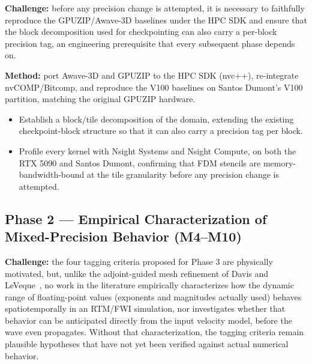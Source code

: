 \documentclass[12pt,a4paper]{article}
\begin{document}
\textbf{Challenge:} before any precision change is attempted, it is
necessary to faithfully reproduce the GPUZIP/Awave-3D baselines under the
HPC SDK and ensure that the block decomposition used for checkpointing can
also carry a per-block precision tag, an engineering prerequisite that
every subsequent phase depends on.

\textbf{Method:} port Awave-3D and GPUZIP to the HPC SDK (nvc++),
re-integrate nvCOMP/Bitcomp, and reproduce the V100 baselines on Santos
Dumont's V100 partition, matching the original GPUZIP hardware.

\begin{itemize}
  \item Establish a block/tile decomposition of the domain, extending the
        existing checkpoint-block structure so that it can also carry a
        precision tag per block.
  \item Profile every kernel with Nsight Systems and Nsight Compute, on
        both the RTX 5090 and Santos Dumont, confirming that FDM stencils
        are memory-bandwidth-bound at the tile granularity before any
        precision change is attempted.
\end{itemize}

\subsection{Phase 2 --- Empirical Characterization of Mixed-Precision
Behavior (M4--M10)}

\textbf{Challenge:} the four tagging criteria proposed for Phase 3 are
physically motivated, but, unlike the adjoint-guided mesh refinement of
Davis and LeVeque~\cite{davis2015adjoint}, no work in the literature
empirically characterizes how the dynamic range of floating-point values
(exponents and magnitudes actually used) behaves spatiotemporally in an
RTM/FWI simulation, nor investigates whether that behavior can be
anticipated directly from the input velocity model, before the wave even
propagates. Without that characterization, the tagging criteria remain
plausible hypotheses that have not yet been verified against actual
numerical behavior.
\end{document}
